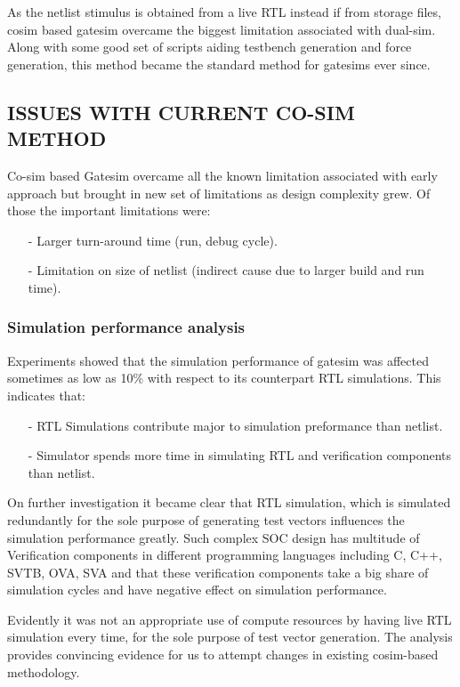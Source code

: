 As the netlist stimulus is obtained from a live RTL instead if from storage files, cosim based gatesim overcame the biggest limitation associated with dual-sim. Along with some good set of scripts aiding testbench generation and force generation, this method became the standard method for gatesims ever since.

\subsection {ISSUES WITH CURRENT CO-SIM METHOD}

Co-sim based Gatesim overcame all the known limitation associated with early approach but brought in new set of limitations as design complexity grew. Of those the important limitations were:

\begin{itemize}
	\item[-]Larger turn-around time (run, debug cycle).
	\item[-]Limitation on size of netlist (indirect cause due to larger build and run time).
\end{itemize}

\subsubsection {Simulation performance analysis}
Experiments showed that the simulation performance of gatesim was affected sometimes as low as 10\% with respect to its counterpart RTL simulations. This indicates that:

\begin{itemize}
	\item[-]RTL Simulations contribute major to simulation preformance than netlist.
	\item[-]Simulator spends more time in simulating RTL and verification components than netlist.
\end{itemize}

On further investigation it became clear that RTL simulation, which is simulated redundantly for the sole purpose of generating test vectors influences the simulation performance greatly. Such complex SOC design has multitude of Verification components in different programming languages including C, C++, SVTB, OVA, SVA and that these verification components take a big share of simulation cycles and have negative effect on simulation performance.

Evidently it was not an appropriate use of compute resources by having live RTL simulation every time, for the sole purpose of test vector generation. The analysis provides convincing evidence for us to attempt changes in existing cosim-based methodology.
